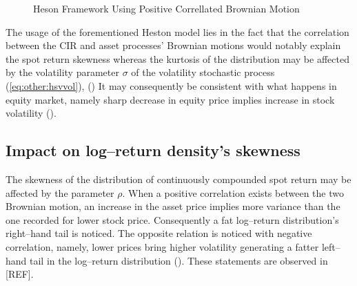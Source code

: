 \documentclass[12pt]{report}
\begin{document}
\begin{figure}[H]
\centering

\caption{Heson Framework Using Positive Correllated Brownian Motion}
\label{p:other:correlatedheston}
\end{figure}



The usage of the forementioned Heston model lies in the fact that the correlation between the CIR and asset processes' Brownian motions would notably explain the spot return skewness whereas the kurtosis of the distribution may be affected by the volatility parameter $\sigma$ of the volatility stochastic process (\cref{eq:other:hsvvol}), (\citet{heston1993})
It may consequently be consistent with what happens in equity market, namely sharp decrease in equity price implies increase in stock volatility (\citet{criso2015}).

\subsection{Impact on log--return density's skewness}
\label{sub:hestonskewness}

The skewness of the distribution of continuously compounded spot return may be affected by the parameter $\rho$.
When a positive correlation exists between the two Brownian motion, an increase in the asset price implies more variance than the one recorded for lower stock price. 
Consequently a fat log--return distribution's right--hand tail is noticed.
The opposite relation is noticed with negative correlation, namely, lower prices bring higher volatility generating a fatter left--hand tail in the log--return distribution (\citet{heston1993}).
These statements are observed in [REF].
\end{document}
